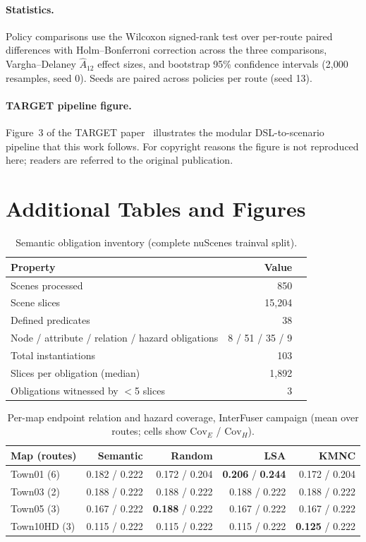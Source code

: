 \documentclass[acmsmall,screen]{acmart}
\begin{document}
\paragraph{Statistics.}
Policy comparisons use the Wilcoxon signed-rank test over per-route paired
differences with Holm--Bonferroni correction across the three comparisons,
Vargha--Delaney $\hat{A}_{12}$ effect sizes, and bootstrap 95\% confidence
intervals (2{,}000 resamples, seed 0). Seeds are paired across policies per
route (seed 13).

\paragraph{TARGET pipeline figure.}
Figure~3 of the TARGET paper~\cite{deng2025target} illustrates the modular
DSL-to-scenario pipeline that this work follows. For copyright reasons the
figure is not reproduced here; readers are referred to the original
publication.

\section{Additional Tables and Figures}
\label{app:tables}

\begin{table}[t]
\caption{Semantic obligation inventory (complete nuScenes trainval split).}
\label{tabA:oracle}
\centering
\small
\begin{tabular}{@{}lrr@{}}
\toprule
Property & Value \\
\midrule
Scenes processed & 850 \\
Scene slices & 15{,}204 \\
Defined predicates & 38 \\
Node / attribute / relation / hazard obligations & 8 / 51 / 35 / 9 \\
Total instantiations & 103 \\
Slices per obligation (median) & 1{,}892 \\
Obligations witnessed by $<$5 slices & 3 \\
\bottomrule
\end{tabular}
\end{table}

\begin{table}[t]
\caption{Per-map endpoint relation and hazard coverage, InterFuser campaign
(mean over routes; cells show $\mathrm{Cov}_E$ / $\mathrm{Cov}_H$).}
\label{tabA:permaps}
\centering
\small
\begin{tabular}{@{}lrrrr@{}}
\toprule
Map (routes) & Semantic & Random & LSA & KMNC \\
\midrule
Town01 (6) & 0.182 / 0.222 & 0.172 / 0.204 & \textbf{0.206} / \textbf{0.244} & 0.172 / 0.204 \\
Town03 (2) & 0.188 / 0.222 & 0.188 / 0.222 & 0.188 / 0.222 & 0.188 / 0.222 \\
Town05 (3) & 0.167 / 0.222 & \textbf{0.188} / 0.222 & 0.167 / 0.222 & 0.167 / 0.222 \\
Town10HD (3) & 0.115 / 0.222 & 0.115 / 0.222 & 0.115 / 0.222 & \textbf{0.125} / 0.222 \\
\bottomrule
\end{tabular}
\end{table}
\end{document}
